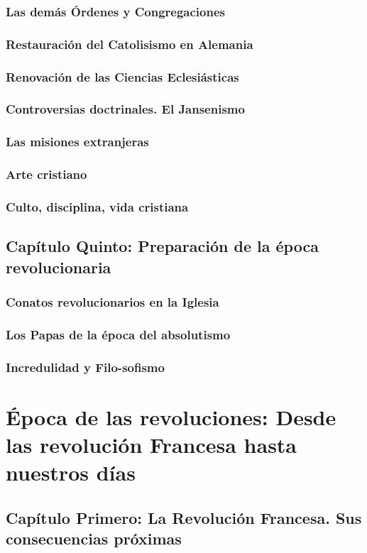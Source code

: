\raggedbottom{} \documentclass[12pt, a4paper]{book}
\begin{document}
\section{Las demás Órdenes y Congregaciones}
\section{Restauración del Catolisismo en Alemania}
\section{Renovación de las Ciencias Eclesiásticas}
\section{Controversias doctrinales. El Jansenismo}
\section{Las misiones extranjeras}
\section{Arte cristiano}
\section{Culto, disciplina, vida cristiana}
\chapter{Capítulo Quinto: Preparación de la época revolucionaria}
\section{Conatos revolucionarios en la Iglesia}
\section{Los Papas de la época del absolutismo}
\section{Incredulidad y Filo-sofismo}
\part{Época de las revoluciones: Desde las revolución Francesa hasta nuestros días}
\chapter{Capítulo Primero: La Revolución Francesa. Sus consecuencias próximas}
\end{document}
